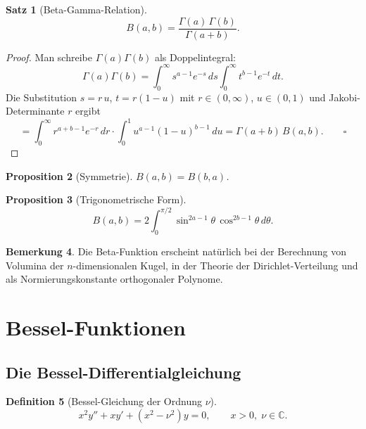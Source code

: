 \documentclass[12pt,a4paper]{amsart}
\newtheorem{theorem}{Satz}[section]
\newtheorem{proposition}[theorem]{Proposition}
\theoremstyle{definition}
\newtheorem{definition}[theorem]{Definition}
\newtheorem{remark}[theorem]{Bemerkung}
\begin{document}
\begin{theorem}[Beta-Gamma-Relation]\label{thm:beta_gamma_de}
\[
  B(a,b) = \frac{\Gamma(a)\,\Gamma(b)}{\Gamma(a+b)}.
\]
\end{theorem}

\begin{proof}
Man schreibe \(\Gamma(a)\Gamma(b)\) als Doppelintegral:
\[
  \Gamma(a)\Gamma(b)
  = \int_0^\infty s^{a-1}e^{-s}\,ds\int_0^\infty t^{b-1}e^{-t}\,dt.
\]
Die Substitution \(s = r\,u\), \(t = r(1-u)\) mit \(r \in (0,\infty)\), \(u \in (0,1)\)
und Jakobi-Determinante \(r\) ergibt
\[
  = \int_0^\infty r^{a+b-1}e^{-r}\,dr \cdot \int_0^1 u^{a-1}(1-u)^{b-1}\,du
  = \Gamma(a+b)\,B(a,b). \qquad\square
\]
\end{proof}

\begin{proposition}[Symmetrie]
\(B(a,b) = B(b,a)\).
\end{proposition}

\begin{proposition}[Trigonometrische Form]
\[
  B(a,b) = 2\int_0^{\pi/2}\sin^{2a-1}\theta\,\cos^{2b-1}\theta\,d\theta.
\]
\end{proposition}

\begin{remark}
Die Beta-Funktion erscheint natürlich bei der Berechnung von Volumina der \(n\)-dimensionalen
Kugel, in der Theorie der Dirichlet-Verteilung und als Normierungskonstante orthogonaler
Polynome.
\end{remark}

\section{Bessel-Funktionen}
\label{sec:bessel}

\subsection{Die Bessel-Differentialgleichung}

\begin{definition}[Bessel-Gleichung der Ordnung \(\nu\)]
\begin{equation}\label{eq:bessel_de}
  x^2 y'' + x y' + (x^2 - \nu^2)y = 0, \qquad x > 0,\; \nu \in \mathbb{C}.
\end{equation}
\end{definition}
\end{document}
